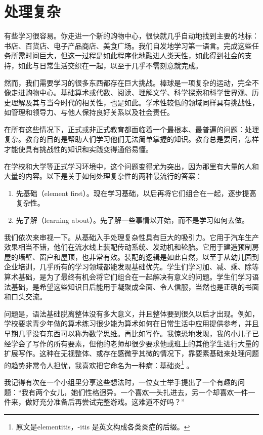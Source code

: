 \section*{处理复杂}

有些学习很容易。你走进一个新的购物中心，很快就几乎自动地找到主要的地标：书店、百货店、电子产品商店、美食广场。我们自发地学习第一语言。完成这些任务所需时间巨大，但这一过程是如此程序化地融进人类天性，如此得到社会的支持，如此与日常生活交织在一起，以至于几乎不需刻意就完成。

然而，我们需要学习的很多东西都存在巨大挑战。棒球是一项复杂的运动，完全不像走进购物中心。基础算术或代数、阅读、理解文学、科学探索和科学世界观、历史理解及其与当今时代的相关性，也是如此。学术性较低的领域同样具有挑战性，如管理和领导力、与他人保持良好关系以及社会责任。

在所有这些情况下，正式或非正式教育都面临着一个最根本、最普遍的问题：处理复杂。教育的目的是帮助人们学习他们无法简单掌握的知识。教育总是要问，怎样才能使具有挑战性的知识和实践变得通俗易懂。

在学校和大学等正式学习环境中，这个问题变得尤为突出，因为那里有大量的人和大量的内容。以下是关于如何处理复杂性的两种最流行的答案：
\begin{enumerate}
\item 先基础（element first）。现在学习基础，以后再将它们组合在一起，逐步提高复杂性。
\item 先了解（learning about）。先了解一些事情以开始，而不是学习如何去做。
\end{enumerate}
我们依次来审视一下。从基础入手处理复杂性具有巨大的吸引力。它用于汽车生产效果相当不错，他们在流水线上装配传动系统、发动机和轮胎。它用于建造预制房屋的墙壁、窗户和屋顶，也非常有效。装配的逻辑是如此自然，以至于从幼儿园到企业培训，几乎所有的学习领域都能发现基础优先。学生们学习加、减、乘、除等算术基础，是为了最终有机会将它们组合在一起解决有意义的问题。学生们学习语法基础，是希望这些知识日后能用于凝聚成全面、令人信服，当然也是正确的书面和口头交流。

问题是，语法基础脱离整体没有多大意义，并且整体要到很久以后才出现。例如，学校要求青少年做的算术练习很少能为算术如何在日常生活中应用提供参考，并且早期几乎没有东西可以称为数学思维。再比如写作。我惊恐地发现，我的小儿子已经学会了写作的所有要素，但他的老师却很少要求他或班上的其他学生进行大量的扩展写作。这种在无视整体、或存在感微乎其微的情况下，靠要素基础来处理问题的趋势非常令人担忧，我喜欢把它命名为一种病：基础炎\footnote{原文是elementitis，-itis 是英文构成各类炎症的后缀。} 。

我记得有次在一个小组里分享这些想法时，一位女士举手提出了一个有趣的问题：“我有两个女儿，她们性格迥异。一个喜欢一头扎进去，另一个却喜欢一件一件来，做好充分准备后再尝试完整游戏。这难道不好吗？”

